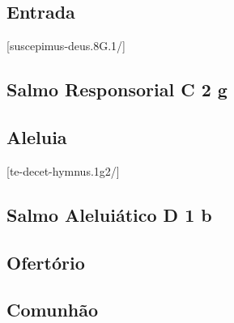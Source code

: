 
\subsection{Entrada}\label{subsection:tempus-per-annum/missa-4/introitus}
[suscepimus-deus.8G.1/]

\AllowPageFlush

\subsection[Salmo Responsorial]{Salmo Responsorial \textmd{C 2 g}}\label{subsection:tempus-per-annum/missa-4/psalmus-responsorius}

\subsection{Aleluia}\label{subsection:tempus-per-annum/missa-4/alleluia}
[te-decet-hymnus.1g2/]

\AllowPageFlush

\subsection[Salmo Aleluiático]{Salmo Aleluiático \textmd{D 1 b}}\label{subsection:tempus-per-annum/missa-4/psalmus-alleluiaticus}

\AllowPageFlush

\subsection{Ofertório}\label{subsection:tempus-per-annum/missa-4/offertorium}

\AllowPageFlush

\subsection{Comunhão}\label{subsection:tempus-per-annum/missa-4/communio}
